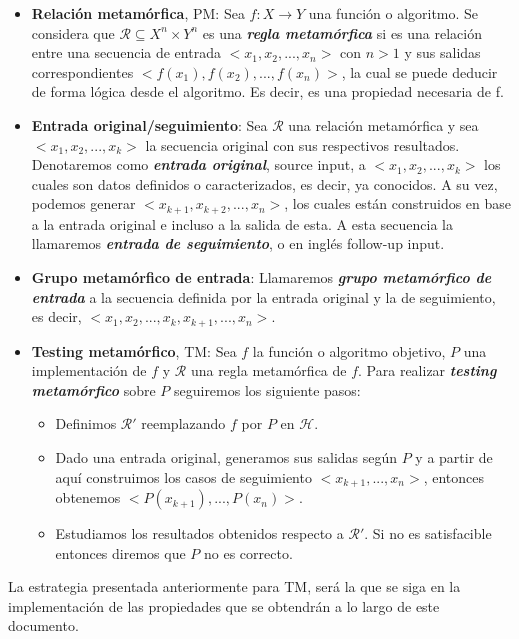 \begin{itemize}
    \item \textbf{Relación metamórfica}, PM: Sea $f: X \rightarrow Y$ una función o algoritmo. Se considera que $\mathscr{R} \subseteq X^{n} \times Y^{n}$ es una \textbf{\textit{regla metamórfica}} si es una relación entre una secuencia de entrada $<x_{1},x_{2},...,x_{n}>$ con $n>1$ y sus salidas correspondientes $<f(x_{1}),f(x_{2}),...,f(x_{n})>$, la cual se puede deducir de forma lógica desde el algoritmo. Es decir, es una propiedad necesaria de f.
    \item \textbf{Entrada original/seguimiento}: Sea $\mathscr{R}$ una relación metamórfica y sea $<x_{1},x_{2},...,x_{k}>$ la secuencia original con sus respectivos resultados. Denotaremos como \textbf{\textit{entrada original}}, source input, a $<x_{1},x_{2},...,x_{k}>$ los cuales son datos definidos o caracterizados, es decir, ya conocidos. A su vez, podemos generar $<x_{k+1},x_{k+2},...,x_{n}>$, los cuales están construidos en base a la entrada original e incluso a la salida de esta. A esta secuencia la llamaremos \textbf{\textit{entrada de seguimiento}}, o en inglés follow-up input.
    \item \textbf{Grupo metamórfico de entrada}: Llamaremos \textbf{\textit{grupo metamórfico de entrada}} a la secuencia definida por la entrada original y la de seguimiento, es decir, $<x_{1},x_{2},...,x_{k},x_{k+1},...,x_{n}>$.
    \item \textbf{Testing metamórfico}, TM: Sea $f$ la función o algoritmo objetivo, $P$ una implementación de $f$ y $\mathscr{R}$ una regla metamórfica de $f$. Para realizar \textbf{\textit{testing metamórfico}} sobre $P$ seguiremos los siguiente pasos:
    \begin{itemize}
        \item Definimos $\mathscr{R}'$ reemplazando $f$ por $P$ en $\mathscr{H}$.
        \item Dado una entrada original, generamos sus salidas según $P$ y a partir de aquí construimos los casos de seguimiento $<x_{k+1},...,x_{n}>$, entonces obtenemos $<P(x_{k+1}),...,P(x_{n})>$.
        \item Estudiamos los resultados obtenidos respecto a $\mathscr{R}'$. Si no es satisfacible entonces diremos que $P$ no es correcto.
    \end{itemize}
\end{itemize}

La estrategia presentada anteriormente para TM, será la que se siga en la implementación de las propiedades que se obtendrán a lo largo de este documento. \newline

